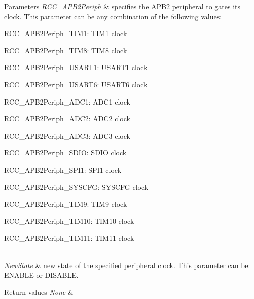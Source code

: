 \begin{DoxyParams}{Parameters}
{\em R\+C\+C\+\_\+\+A\+P\+B2\+Periph} & specifies the A\+P\+B2 peripheral to gates its clock. This parameter can be any combination of the following values\+: \begin{DoxyItemize}
\item R\+C\+C\+\_\+\+A\+P\+B2\+Periph\+\_\+\+T\+I\+M1\+: T\+I\+M1 clock \item R\+C\+C\+\_\+\+A\+P\+B2\+Periph\+\_\+\+T\+I\+M8\+: T\+I\+M8 clock \item R\+C\+C\+\_\+\+A\+P\+B2\+Periph\+\_\+\+U\+S\+A\+R\+T1\+: U\+S\+A\+R\+T1 clock \item R\+C\+C\+\_\+\+A\+P\+B2\+Periph\+\_\+\+U\+S\+A\+R\+T6\+: U\+S\+A\+R\+T6 clock \item R\+C\+C\+\_\+\+A\+P\+B2\+Periph\+\_\+\+A\+D\+C1\+: A\+D\+C1 clock \item R\+C\+C\+\_\+\+A\+P\+B2\+Periph\+\_\+\+A\+D\+C2\+: A\+D\+C2 clock \item R\+C\+C\+\_\+\+A\+P\+B2\+Periph\+\_\+\+A\+D\+C3\+: A\+D\+C3 clock \item R\+C\+C\+\_\+\+A\+P\+B2\+Periph\+\_\+\+S\+D\+IO\+: S\+D\+IO clock \item R\+C\+C\+\_\+\+A\+P\+B2\+Periph\+\_\+\+S\+P\+I1\+: S\+P\+I1 clock \item R\+C\+C\+\_\+\+A\+P\+B2\+Periph\+\_\+\+S\+Y\+S\+C\+FG\+: S\+Y\+S\+C\+FG clock \item R\+C\+C\+\_\+\+A\+P\+B2\+Periph\+\_\+\+T\+I\+M9\+: T\+I\+M9 clock \item R\+C\+C\+\_\+\+A\+P\+B2\+Periph\+\_\+\+T\+I\+M10\+: T\+I\+M10 clock \item R\+C\+C\+\_\+\+A\+P\+B2\+Periph\+\_\+\+T\+I\+M11\+: T\+I\+M11 clock \end{DoxyItemize}
\\
\hline
{\em New\+State} & new state of the specified peripheral clock. This parameter can be\+: E\+N\+A\+B\+LE or D\+I\+S\+A\+B\+LE. \\
\hline
\end{DoxyParams}

\begin{DoxyRetVals}{Return values}
{\em None} & \\
\hline
\end{DoxyRetVals}
